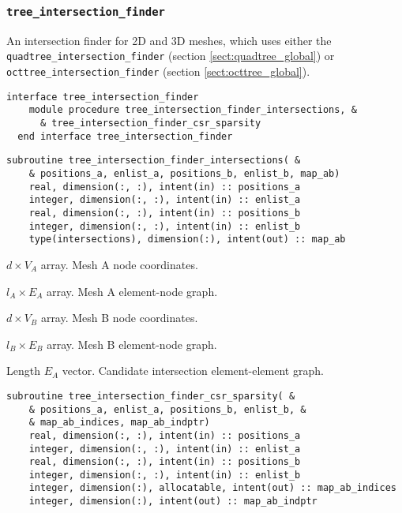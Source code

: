 \documentclass{article}
\begin{document}
\subsubsection{\texttt{tree\_intersection\_finder}}

An intersection finder for 2D and 3D meshes, which uses either the
\verb+quadtree_intersection_finder+ (section \ref{sect:quadtree_global}) or
\verb+octtree_intersection_finder+ (section \ref{sect:octtree_global}).

\begin{lstlisting}[language=FORTRAN]
  interface tree_intersection_finder
    module procedure tree_intersection_finder_intersections, &
      & tree_intersection_finder_csr_sparsity
  end interface tree_intersection_finder
\end{lstlisting}

\begin{lstlisting}[language=FORTRAN]
  subroutine tree_intersection_finder_intersections( &
    & positions_a, enlist_a, positions_b, enlist_b, map_ab)
    real, dimension(:, :), intent(in) :: positions_a
    integer, dimension(:, :), intent(in) :: enlist_a
    real, dimension(:, :), intent(in) :: positions_b
    integer, dimension(:, :), intent(in) :: enlist_b
    type(intersections), dimension(:), intent(out) :: map_ab
\end{lstlisting}

\begin{description}[font=\ttfamily\bfseries,leftmargin=2.2\parindent,labelindent=1.7\parindent,noitemsep]
  \item[positions\_a] $d \times V_A$ array. Mesh A node coordinates.
  \item[enlist\_a] $l_A \times E_A$ array. Mesh A element-node graph.
  \item[positions\_b] $d \times V_B$ array. Mesh B node coordinates.
  \item[enlist\_b] $l_B \times E_B$ array. Mesh B element-node graph.
  \item[map\_ab] Length $E_A$ vector. Candidate intersection element-element
    graph.
\end{description}

\begin{lstlisting}[language=FORTRAN]
  subroutine tree_intersection_finder_csr_sparsity( &
    & positions_a, enlist_a, positions_b, enlist_b, &
    & map_ab_indices, map_ab_indptr)
    real, dimension(:, :), intent(in) :: positions_a
    integer, dimension(:, :), intent(in) :: enlist_a
    real, dimension(:, :), intent(in) :: positions_b
    integer, dimension(:, :), intent(in) :: enlist_b
    integer, dimension(:), allocatable, intent(out) :: map_ab_indices
    integer, dimension(:), intent(out) :: map_ab_indptr
\end{lstlisting}
\end{document}
